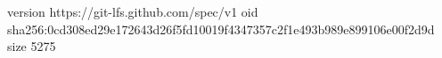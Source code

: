 version https://git-lfs.github.com/spec/v1
oid sha256:0cd308ed29e172643d26f5fd10019f4347357c2f1e493b989e899106e00f2d9d
size 5275
